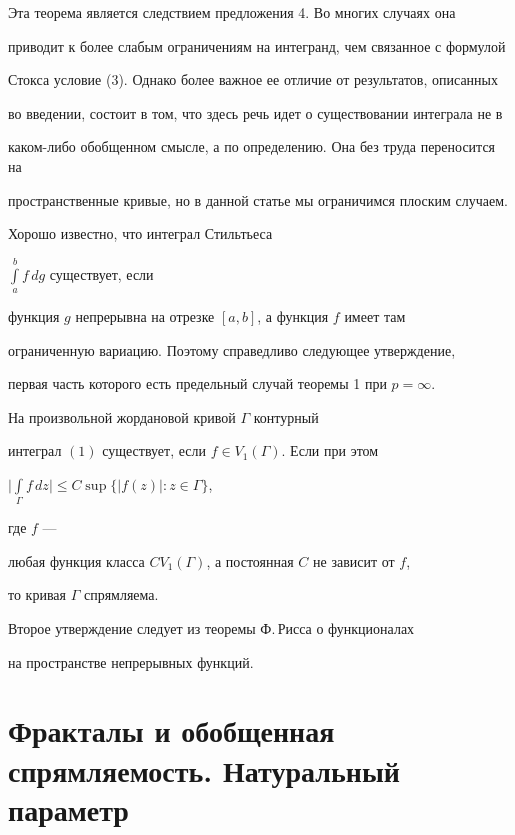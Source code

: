 Эта теорема является следствием предложения 4. Во многих случаях она


приводит к более слабым ограничениям на интегранд, чем связанное с формулой


Стокса условие (3). Однако более важное ее отличие от результатов, описанных


во введении, состоит в том, что здесь речь идет о существовании интеграла не в


каком-либо обобщенном смысле, а по определению. Она без труда переносится на


пространственные кривые, но в данной статье мы ограничимся плоским случаем.





Хорошо известно, что интеграл Стильтьеса


$\int\limits^b_a f\,dg$ существует, если


функция $g$ непрерывна на отрезке $[a, b]$, а функция $f$ имеет там


ограниченную вариацию. Поэтому справедливо следующее утверждение,


первая часть которого есть предельный случай теоремы 1 при $p=\infty.$





\begin{thm}


На произвольной жордановой кривой $\Gamma$ контурный


интеграл $(1)$ существует, если $f\in V_{1}(\Gamma)$. Если при этом


$\Big|\int\limits_{\Gamma}f\,dz\Big|\le C\sup\{|f(z)|:z\in\Gamma\}$,


где $f$ ---


любая функция класса $CV_1 (\Gamma)$, а постоянная $C$ не зависит от $f$,


то кривая $\Gamma$ спрямляема.


\end{thm}





Второе утверждение следует из теоремы Ф.\,Рисса о функционалах


на пространстве непрерывных функций.





\section{Фракталы и обобщенная спрямляемость. Натуральный параметр}





